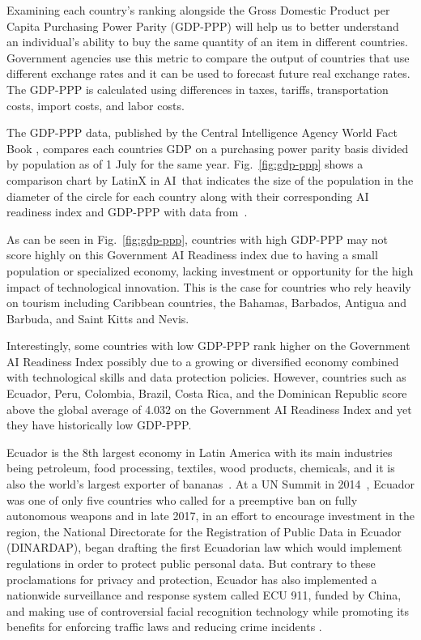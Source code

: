 \documentclass[conference]{IEEEtran}
\begin{document}
Examining each country's ranking alongside the Gross Domestic Product per Capita Purchasing Power Parity (GDP-PPP) will help us to better understand an individual's ability to buy the same quantity of an item in different countries. Government agencies use this metric to compare the output of countries that use different exchange rates and it can be used to forecast future real exchange rates. The GDP-PPP is calculated using differences in taxes, tariffs, transportation costs, import costs, and labor costs.

The GDP-PPP data, published by the Central Intelligence Agency World Fact Book \cite{central2019world}, compares each countries GDP on a purchasing power parity basis divided by population as of 1 July for the same year. Fig.~\ref{fig:gdp-ppp} shows a comparison chart by LatinX in AI\texttrademark~that indicates the size of the population in the diameter of the circle for each country along with their corresponding AI readiness index and GDP-PPP with data from~\cite{central2019world,miller2019government}.

As can be seen in  Fig.~\ref{fig:gdp-ppp}, countries with high GDP-PPP may not score highly on this Government AI Readiness index due to having a small population or specialized economy, lacking investment or opportunity for the high impact of technological innovation. This is the case for countries who rely heavily on tourism including Caribbean countries, the Bahamas, Barbados, Antigua and Barbuda, and Saint Kitts and Nevis.

Interestingly, some countries with low GDP-PPP rank higher on the Government AI Readiness Index possibly due to a growing or diversified economy combined with technological skills and data protection policies. However, countries such as Ecuador, Peru, Colombia, Brazil, Costa Rica, and the Dominican Republic score above the global average of 4.032 on the Government AI Readiness Index and yet they have historically low GDP-PPP.

Ecuador is the 8th largest economy in Latin America with its main industries being petroleum, food processing, textiles, wood products, chemicals, and it is also the world's largest exporter of bananas~\cite{rivera2017synergies}. At a UN Summit in 2014~\cite{jeffries2014only}, Ecuador was one of only five countries who called for a preemptive ban on fully autonomous weapons and in late 2017, in an effort to encourage investment in the region, the National Directorate for the Registration of Public Data in Ecuador (DINARDAP), began drafting the first Ecuadorian law which would implement regulations in order to protect public personal data. But contrary to these proclamations for privacy and protection, Ecuador has also implemented a nationwide surveillance and response system called ECU 911, funded by China, and making use of controversial facial recognition technology while promoting its benefits for enforcing traffic laws and reducing crime incidents \cite{corral2018911}.
\end{document}
